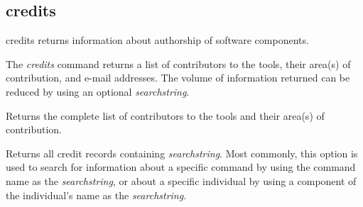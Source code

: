 \subsection{credits}

\begin{tclcommandname}{credits}%
returns information about authorship of software components.
\end{tclcommandname}

\begin{tclcommandsynopsis}
\end{tclcommandsynopsis}

\begin{tclcommanddescription}
The \emph{credits} command returns a list of contributors to the tools,
their area(s) of contribution, and e-mail addresses.  The volume of
information returned can be reduced by using an optional \emph{searchstring}.

\begin{tclcommandinternaldescription}
Returns the complete list of contributors to the tools and their area(s) of contribution.
\end{tclcommandinternaldescription}

\begin{tclcommandinternaldescription}
Returns all credit records containing \emph{searchstring}.
Most commonly, this option is used to search for information about a specific
command by using the command name as the \emph{searchstring}, or about a
specific individual by using a component of the individual's name as the
\emph{searchstring}.

\end{tclcommandinternaldescription}

\end{tclcommanddescription}

